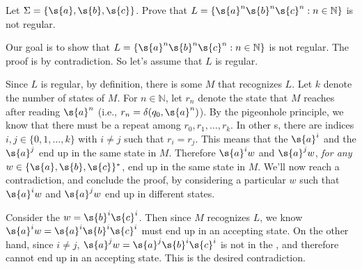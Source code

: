 \begin{flex}
\begin{exercise} \label{exercise:anbncn-is-not-regular} 
Let $\Sigma = \{\s{a},\s{b},\s{c}\}$. Prove that $L = \{\s{a}^n\s{b}^n\s{c}^n: n \in \mathbb{N}\}$ is not regular.
\end{exercise}

\begin{solution}
Our goal is to show that $L = \{\s{a}^n\s{b}^n\s{c}^n: n \in \mathbb{N}\}$ is not regular. The proof is by contradiction. So let's assume that $L$ is regular. 

Since $L$ is regular, by definition, there is some  $M$ that recognizes $L$. Let $k$ denote the number of states of $M$. For $n \in \mathbb{N}$, let $r_n$ denote the state that $M$ reaches after reading $\s{a}^n$ (i.e., $r_n = \delta(q_0, \s{a}^n)$). By the pigeonhole principle, we know that there must be a repeat among $r_0, r_1,\ldots, r_k$. In other s, there are indices $i, j \in \{0,1,\ldots,k\}$ with $i \neq j$ such that $r_i = r_j$. This means that the  $\s{a}^i$ and the  $\s{a}^j$ end up in the same state in $M$. Therefore $\s{a}^iw$ and $\s{a}^jw$, \emph{for any}  $w \in \{\s{a},\s{b},\s{c}\}^*$, end up in the same state in $M$. We'll now reach a contradiction, and conclude the proof, by considering a particular $w$ such that $\s{a}^iw$ and $\s{a}^jw$ end up in different states. 

Consider the  $w = \s{b}^i\s{c}^i$. Then since $M$ recognizes $L$, we know $\s{a}^iw = \s{a}^i\s{b}^i\s{c}^i$ must end up in an accepting state. On the other hand, since $i \neq j$, $\s{a}^jw = \s{a}^j\s{b}^i\s{c}^i$ is not in the , and therefore cannot end up in an accepting state. This is the desired contradiction.
\end{solution}
\end{flex}


